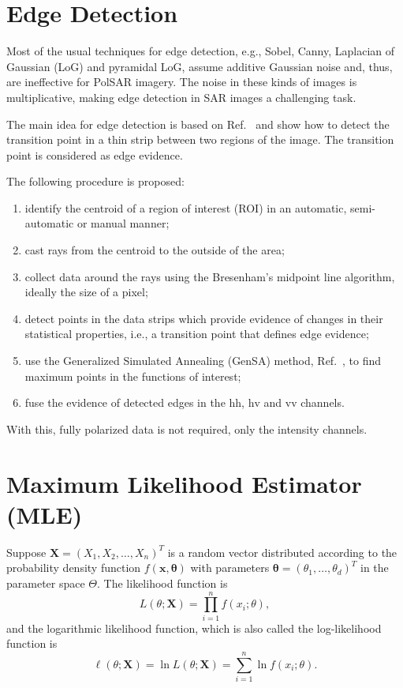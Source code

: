 \documentclass[conference]{IEEEtran}
\begin{document}
\section{Edge Detection}\label{sec_04}

Most of the usual techniques for edge detection, e.g., 
Sobel, Canny, Laplacian of Gaussian (LoG) and pyramidal LoG, assume additive Gaussian noise and, thus, are ineffective for PolSAR imagery.
The noise in these kinds of images is multiplicative, making edge detection in SAR images a challenging task.

The main idea for edge detection is based on Ref.~\cite{nhfc, gmbf} and show how to detect the transition point in a thin strip between two regions of the image. The transition point is considered as edge evidence. 

The following procedure is proposed:
\begin{enumerate}
	\item identify the centroid of a region of interest (ROI) in an automatic, semi-automatic or manual manner;
	\item cast rays from the centroid to the outside of the area;
	\item collect data around the rays using the  Bresenham's midpoint line algorithm, ideally the size of a pixel;
	\item detect points in the data strips which provide evidence of changes in their statistical properties, i.e., a transition point that defines edge evidence;
	\item use the Generalized Simulated Annealing (GenSA) method, Ref.~\cite{xgsh}, to find maximum points in the functions of interest;
	\item fuse the evidence of detected edges in the $\text{hh}$, $\text{hv}$ and $\text{vv}$ channels.
\end{enumerate}
With this, fully polarized data is not required, only the intensity channels.

\section{Maximum Likelihood Estimator (MLE)}\label{sec_05}

Suppose $\mathbf{X}=(X_1,X_2,\dots,X_n)^T$ is a random vector distributed according to the probability density function $f(\mathbf{x},\mathbf{\theta})$ with parameters $\mathbf{\theta}=(\theta_1,\dots,\theta_d)^T$ in the parameter space $\Theta$.
The likelihood function is
\begin{equation*}
    L(\theta;\mathbf{X}) = \prod_{i=1}^{n}f(x_i;\theta),
\end{equation*}
and the logarithmic likelihood function, which is also called the log-likelihood function is
\begin{equation}
	\ell(\theta;\mathbf{X})= \ln L(\theta;\mathbf{X}) = \sum_{i=1}^{n}\ln f(x_i;\theta).
	\label{eq_05}
\end{equation}
\end{document}

